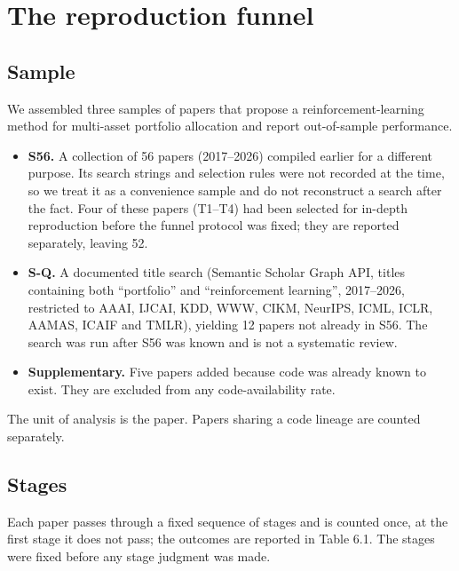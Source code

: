 \documentclass[12pt,a4paper]{report}
\providecommand{\tightlist}{\setlength{\itemsep}{0pt}\setlength{\parskip}{0pt}}
\begin{document}
\section{The reproduction funnel}\label{the-reproduction-funnel}

\subsection{Sample}\label{sample}

We assembled three samples of papers that propose a
reinforcement-learning method for multi-asset portfolio allocation and
report out-of-sample performance.

\begin{itemize}
\tightlist
\item
  \textbf{S56.} A collection of 56 papers (2017--2026) compiled earlier
  for a different purpose. Its search strings and selection rules were
  not recorded at the time, so we treat it as a convenience sample and
  do not reconstruct a search after the fact. Four of these papers
  (T1--T4) had been selected for in-depth reproduction before the funnel
  protocol was fixed; they are reported separately, leaving 52.
\item
  \textbf{S-Q.} A documented title search (Semantic Scholar Graph API,
  titles containing both ``portfolio'' and ``reinforcement learning'',
  2017--2026, restricted to AAAI, IJCAI, KDD, WWW, CIKM, NeurIPS, ICML,
  ICLR, AAMAS, ICAIF and TMLR), yielding 12 papers not already in S56.
  The search was run after S56 was known and is not a systematic review.
\item
  \textbf{Supplementary.} Five papers added because code was already
  known to exist. They are excluded from any code-availability rate.
\end{itemize}

The unit of analysis is the paper. Papers sharing a code lineage are
counted separately.

\subsection{Stages}\label{stages}

Each paper passes through a fixed sequence of stages and is counted
once, at the first stage it does not pass; the outcomes are reported in
Table 6.1. The stages were fixed before any stage judgment was made.
\end{document}
